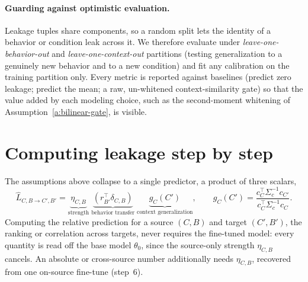 \documentclass[11pt]{article}
\theoremstyle{definition}
\theoremstyle{definition}
\theoremstyle{assumptionstyle}
\newcounter{prediction}
\newcommand{\disp}{\delta_{C,B}}
\begin{document}
\paragraph{Guarding against optimistic evaluation.}
Leakage tuples share components, so a random split lets the identity of a behavior
or condition leak across it. We therefore evaluate under
\emph{leave-one-behavior-out} and \emph{leave-one-context-out} partitions (testing
generalization to a genuinely new behavior and to a new condition) and fit any
calibration on the training partition only. Every metric is reported against
baselines (predict zero leakage; predict the mean; a raw, un-whitened
context-similarity gate) so that the value added by each modeling choice, such as
the second-moment whitening of Assumption~\ref{a:bilinear-gate}, is visible.


\section{Computing leakage step by step}
\label{sec:worked}
The assumptions above collapse to a single predictor, a product of three scalars,
\[
\widehat L_{C,B\to C',B'}
=\underbrace{\eta_{C,B}}_{\text{strength}}\;
\underbrace{(r_{B'}^\top \disp)}_{\text{behavior transfer}}\;
\underbrace{g_{C}(C')}_{\text{context generalization}},
\qquad
g_{C}(C')=\frac{c_{C}^\top \Sigma_c^{-1}c_{C'}}{c_{C}^\top \Sigma_c^{-1}c_{C}}.
\]
Computing the relative prediction for a source $(C,B)$ and target $(C',B')$, the
ranking or correlation across targets, never requires the fine-tuned model: every quantity is
read off the base model $\theta_0$, since the source-only strength $\eta_{C,B}$ cancels. An
absolute or cross-source number additionally needs $\eta_{C,B}$, recovered from one on-source
fine-tune (step~6).
\end{document}
